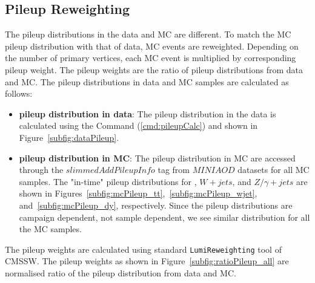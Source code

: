 \subsection{Pileup Reweighting}
\label{s:pileup_reweighting}
The pileup distributions in the data and MC are different. To match the MC 
pileup distribution with that of data, MC events are reweighted. Depending on 
the number of primary vertices, each MC event is multiplied by corresponding 
pileup weight. The pileup weights are the ratio of pileup distributions from 
data and MC. The pileup distributions in data and MC samples are calculated as 
follows:
\begin{itemize}
    \item {\bf pileup distribution in data}: The pileup distribution in the data is 
        calculated using the Command (\ref{cmd:pileupCalc}) and shown in 
        Figure~\ref{subfig:dataPileup}.
    \item {\bf pileup distribution in MC}: The pileup distribution in MC are accessed 
        through the $slimmedAddPileupInfo$ tag from $MINIAOD$ datasets for all MC samples. 
        The "in-time" pileup distributions for \ttjets, $W + jets$, and 
        $Z/\gamma + jets$ are shown in Figures~\ref{subfig:mcPileup_tt},~\ref{subfig:mcPileup_wjet},
        and~\ref{subfig:mcPileup_dy}, respectively. Since the pileup distributions
        are campaign dependent, not sample dependent, we see similar distribution for all 
        the MC samples.
\end{itemize}
The pileup weights are calculated using standard \verb|LumiReweighting| tool 
of CMSSW. The pileup weights as shown in Figure~\ref{subfig:ratioPileup_all} are 
normalised ratio of the pileup distribution from data and MC.
